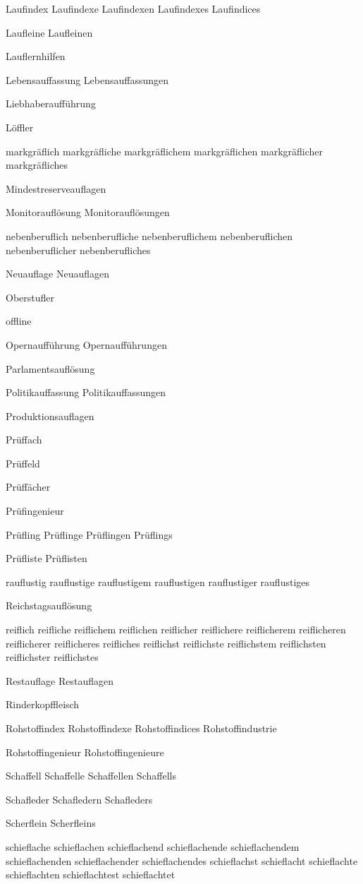 Laufindex Laufindexe Laufindexen Laufindexes Laufindices

Laufleine Laufleinen

Lauflernhilfen

Lebensauffassung Lebensauffassungen

Liebhaberaufführung 

Löffler

markgräflich markgräfliche markgräflichem markgräflichen markgräflicher markgräfliches

Mindestreserveauflagen

Monitorauflösung Monitorauflösungen

nebenberuflich nebenberufliche nebenberuflichem nebenberuflichen nebenberuflicher nebenberufliches

Neuauflage Neuauflagen

Oberstufler

offline

Opernaufführung Opernaufführungen

Parlamentsauflösung

Politikauffassung Politikauffassungen

Produktionsauflagen

Prüffach 

Prüffeld

Prüffächer

Prüfingenieur

Prüfling Prüflinge Prüflingen Prüflings

Prüfliste Prüflisten

rauflustig rauflustige rauflustigem rauflustigen rauflustiger rauflustiges

Reichstagsauflösung

reiflich reifliche reiflichem reiflichen reiflicher reiflichere reiflicherem reiflicheren reiflicherer reiflicheres reifliches reiflichst reiflichste reiflichstem reiflichsten reiflichster reiflichstes

Restauflage Restauflagen

Rinderkopffleisch

Rohstoffindex Rohstoffindexe Rohstoffindices Rohstoffindustrie

Rohstoffingenieur Rohstoffingenieure

Schaffell Schaffelle Schaffellen Schaffells

Schafleder Schafledern Schafleders

Scherflein Scherfleins

schieflache schieflachen schieflachend schieflachende schieflachendem schieflachenden schieflachender schieflachendes schieflachst schieflacht schieflachte schieflachten schieflachtest schieflachtet

